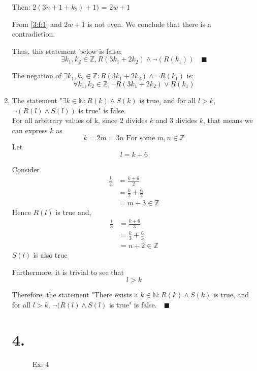 \documentclass{article}
\newcommand{\Z}{\mathbb{Z}}
\renewcommand{\a}{\land}
\renewcommand{\o}{\lor}
\newcommand{\n}{\neg}
\begin{document}
\begin{enumerate}[label=({\alph*})]
			Then:  $2(3n + 1 + {k_2}) + 1) $ = \(2w + 1\)

			From  \eqref{3:f:1} and \(2w + 1\) is not even.
			We conclude that there is a contradiction.

			Thus, this statement below is false:
			\begin{equation}
				\exists {k_1}, {k_2} \in \mathbb{Z}, R(3{k_1} + 2{k_2}) \a \n(R({k_1})) \quad \blacksquare
			\end{equation}

			The negation of \(\exists {k_1}, {k_2} \in \mathbb{Z}: R(3{k_1} + 2{k_2})\a \n R(k_1) \) is:
			\begin{equation}
				\forall {k_1}, {k_2} \in \mathbb{Z}, \n R(3{k_1} + 2{k_2}) \o R({k_1})
			\end{equation}

		\item The statement "$ \exists k \in \mathbb{N}: R(k) \a S(k)$ is true, and for all $l > k$, $\n (R(l) \a S(l))$ is true" is false.\\
		
		For all arbitrary values of k, since \(2\) divides \(k\) and 3 divides \(k\), that means we can express \(k\) as 
		\[k = 2m = 3n \text{ For some } m, n \in \Z\]
		Let
		\[l = k + 6\]
		
		Consider 
		\begin{align*}
			\frac{l}{2} &= \frac{k + 6}{2}\\
			&= \frac{k}{2} + \frac{6}{2}\\
			&= m + 3 \in \Z
		\end{align*}
		Hence \(R(l)\) is true and,
		\begin{align*}
			\frac{l}{3} &= \frac{k + 6}{3}\\
			&= \frac{k}{3} + \frac{6}{3}\\
			&= n + 2 \in \Z
		\end{align*}
		\(S(l)\) is also true

		Furthermore, it is trivial to see that 
		\[l > k\]
		
		Therefore, the statement "There exists a $k \in \mathbb{N}: R(k) \a S(k)$ is true, and for all $l > k$, $\n (R(l) \a S(l)$ is true" is false.\(\quad \blacksquare\)\\
	\section*{4.}
	\begin{figure}[ht]
		\centering
			 \caption{Ex: 4}
			 \label{Ex:4}
	\end{figure}


\end{enumerate}
\end{document}

